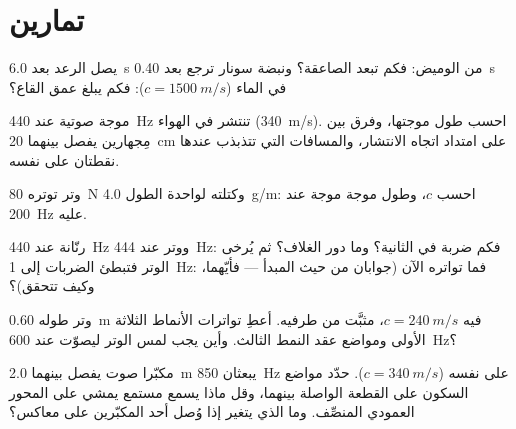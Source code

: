 \section{تمارين}

\begin{exercise}[$\star$]\label{exo:b1:wave-propagation:1}
يصل الرعد بعد \qty{6.0}{s} من الوميض: فكم تبعد الصاعقة؟ ونبضة
سونار ترجع بعد \qty{0.40}{s} في الماء ($c = \qty{1500}{m/s}$):
فكم يبلغ عمق القاع؟
\end{exercise}

\begin{exercise}[$\star$]\label{exo:b1:wave-propagation:2}
موجة صوتية عند \qty{440}{Hz} تنتشر في الهواء (\qty{340}{m/s}). احسب
طول موجتها، وفرق  بين مِجهارين يفصل بينهما \qty{20}{cm}
على امتداد اتجاه الانتشار، والمسافات التي تتذبذب عندها
نقطتان على  نفسه.
\end{exercise}

\begin{exercise}[$\star$]\label{exo:b1:wave-propagation:3}
وتر توتره \qty{80}{N} وكتلته لواحدة الطول
\qty{4.0}{g/m}: احسب $c$، وطول موجة موجة عند \qty{200}{Hz}
عليه.
\end{exercise}

\begin{exercise}[$\star$]\label{exo:b1:wave-propagation:4}
رنّانة عند \qty{440}{Hz} ووتر عند \qty{444}{Hz}: فكم ضربة في
الثانية؟ وما دور الغلاف؟ ثم يُرخى الوتر
فتبطئ الضربات إلى \qty{1}{Hz}: فما تواتره
الآن (جوابان من حيث المبدأ --- فأيّهما، وكيف تتحقق)؟
\end{exercise}

\begin{exercise}[$\star\star$]\label{exo:b1:wave-propagation:5}
وتر طوله \qty{0.60}{m}  فيه $c = \qty{240}{m/s}$، مثبَّت من
طرفيه. أعطِ تواترات الأنماط الثلاثة الأولى ومواضع عقد
النمط الثالث. وأين يجب لمس الوتر ليصوّت عند
\qty{600}{Hz}؟
\end{exercise}

\begin{exercise}[$\star\star$]\label{exo:b1:wave-propagation:6}
مكبّرا صوت يفصل بينهما \qty{2.0}{m} يبعثان \qty{850}{Hz} على  نفسه
($c = \qty{340}{m/s}$). حدّد مواضع السكون على القطعة الواصلة
بينهما، وقل ماذا يسمع مستمع يمشي على المحور العمودي
المنصِّف. وما الذي يتغير إذا وُصل أحد المكبّرين على  معاكس؟
\end{exercise}


